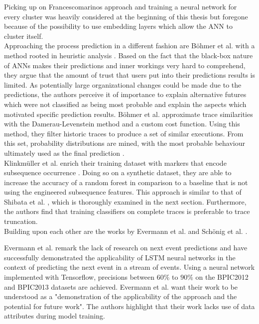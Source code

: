 Picking up on Francescomarinos approach and training a neural network for every cluster was heavily considered at the beginning of this thesis but foregone because of the possibility to use embedding layers which allow the ANN to cluster itself.\\

Approaching the process prediction in a different fashion are Böhmer et al. with a method rooted in heuristic analysis \cite{boehmer2018probability}. Based on the fact that the black-box nature of ANNs makes their predictions and inner workings very hard to comprehend, they argue that the amount of trust that users put into their predictions results is limited. As potentially large organizational changes could be made due to the predictions, the authors perceive it of importance to explain alternative futures which were not classified as being most probable and explain the aspects which motivated specific prediction results.
Böhmer et al. approximate trace similarities with the Damerau-Levenstein method and a custom cost function. Using this method, they filter historic traces to produce a set of similar executions. From this set, probability distributions are mined, with the most probable behaviour ultimately used as the final prediction \cite{boehmer2018probability}.\\

Klinkmüller et al. enrich their training dataset with markers that encode subsequence occurrence \cite{klinkmuller2018reliablemonitoring}. Doing so on a synthetic dataset, they are able to increase the accuracy of a random forest in comparison to a baseline that is not using the engineered subsequence features. This approach is similar to that of Shibata et al. \cite{shibata2016bipartite}, which is thoroughly examined in the next section. Furthermore, the authors find that training classifiers on complete traces is preferable to trace truncation.\\

Building upon each other are the works by Evermann et al. \cite{evermann2016} and Schönig et al. \cite{schoenig2018}.

Evermann et al. remark the lack of research on next event predictions and have successfully demonstrated the applicability of LSTM neural networks in the context of predicting the next event in a stream of events. Using a neural network implemented with Tensorflow, precisions between $60\%$ to $90\%$ on the BPIC2012 and BPIC2013 datasets are achieved. Evermann et al. want their work to be understood as a "demonstration of the applicability of the approach and the potential for future work". The authors highlight that their work lacks use of data attributes during model training. 

